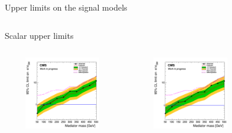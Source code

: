 \documentclass[8pt]{beamer}
\begin{document}
\begin{frame}{Upper limits on the signal models}
\begin{columns}
\begin{column}{1.09\textwidth}
\begin{block}{\centering Scalar upper limits}\end{block}
\end{column}
\end{columns} \vspace{-5pt}
\begin{columns}
		\begin{column}{0.33\textwidth}
			\begin{center}
			\vspace{-8pt}
			\begin{block}{}\end{block} \vspace{-10pt}
     			\includegraphics[width=1.0\textwidth, height=90pt]{figs/limit_scalar_2016_attempt7_v2.png}
    		\end{center}		
		\end{column} 
		\begin{column}{0.33\textwidth}
			\begin{center}
			\vspace{-8pt}
			\begin{block}{}\end{block} \vspace{-10pt}
     			\includegraphics[width=1.0\textwidth, height=90pt]{figs/limit_scalar_2017_attempt7_v2.png}
    		\end{center}		
		\end{column} 
		\begin{column}{0.33\textwidth}
			\begin{center}
			\vspace{-8pt}

\end{center}
\end{column}
\end{columns}
\end{frame}
\end{document}

